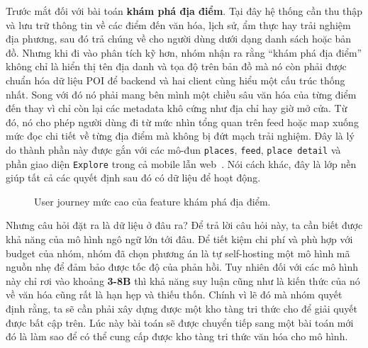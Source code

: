 Trước mắt đối với bài toán \textbf{khám phá địa điểm}. Tại đây hệ thống
cần thu thập và lưu trữ thông tin về các điểm đến văn hóa, lịch sử, ẩm
thực hay trải nghiệm địa phương, sau đó trả chúng về cho người dùng dưới
dạng danh sách hoặc bản đồ. Nhưng khi đi vào phân tích kỹ hơn, nhóm nhận
ra rằng ``khám phá địa điểm'' không chỉ là hiển thị tên địa danh và tọa
độ trên bản đồ mà nó còn phải được chuẩn hóa dữ liệu POI để backend và hai
client cùng hiểu một cấu trúc thống nhất. Song với đó nó phải mang bên mình một chiều sâu văn
hóa của từng điểm đến thay vì chỉ còn lại các metadata khô cứng như địa
chỉ hay giờ mở cửa. Từ đó, nó cho phép người dùng đi từ mức nhìn
tổng quan trên feed hoặc map xuống mức đọc chi tiết về từng địa điểm mà
không bị đứt mạch trải nghiệm. Đây là lý do thành phần này được gắn với
các mô-đun \texttt{places}, \texttt{feed}, \texttt{place detail} và phần
giao diện \texttt{Explore} trong cả mobile lẫn web~\cite{bevietnam_spec}.
Nói cách khác, đây là lớp nền giúp tất cả các quyết định sau đó có dữ
liệu để hoạt động.

\begin{figure}[H]
\centering
{}
\caption{User journey mức cao của feature khám phá địa điểm.}
\label{fig:journey_place_discovery}
\end{figure}

Nhưng câu hỏi đặt ra là dữ liệu ở đâu ra? Để trả lời câu hỏi này, ta cần biết được khả năng của mô hình ngô ngữ lớn tới đâu. Để tiết kiệm chi phí
và phù hợp với budget của nhóm, nhóm đã chọn phương án là tự self-hosting một mô hình mã nguồn nhẹ để đảm bảo được tốc độ của phản hồi. 
Tuy nhiên đối với các mô hình này chỉ rơi vào khoảng \textbf{3-8B} thì khả năng suy luận cũng như là kiến thức của nó về văn hóa cũng rất
là hạn hẹp và thiếu thốn. Chính vì lẽ đó mà nhóm quyết định rằng, ta sẽ cần phải xây dựng được một kho tàng tri thức cho để giải quyết được bất cập trên.
Lúc này bài toán sẽ được chuyển tiếp sang một bài toán mới đó là làm sao để có thể cung cấp được kho tàng tri thức văn hóa cho mô hình.


